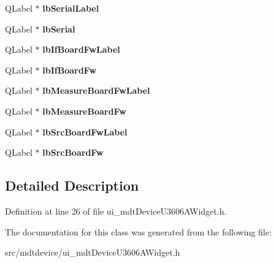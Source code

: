 \begin{DoxyCompactItemize}
\item 
\hypertarget{class_ui__mdt_device_u3606_a_widget_abdff7cf61e6f613b24d1799522c0e357}{
QLabel $\ast$ {\bfseries lbSerialLabel}}
\label{class_ui__mdt_device_u3606_a_widget_abdff7cf61e6f613b24d1799522c0e357}

\item 
\hypertarget{class_ui__mdt_device_u3606_a_widget_a268a390c071e035acaa2f1b4d211bc31}{
QLabel $\ast$ {\bfseries lbSerial}}
\label{class_ui__mdt_device_u3606_a_widget_a268a390c071e035acaa2f1b4d211bc31}

\item 
\hypertarget{class_ui__mdt_device_u3606_a_widget_ad11e8aded543cc1eeaaaf3e6753089d3}{
QLabel $\ast$ {\bfseries lbIfBoardFwLabel}}
\label{class_ui__mdt_device_u3606_a_widget_ad11e8aded543cc1eeaaaf3e6753089d3}

\item 
\hypertarget{class_ui__mdt_device_u3606_a_widget_af7898574daf7278c6eedbcfabc4dd715}{
QLabel $\ast$ {\bfseries lbIfBoardFw}}
\label{class_ui__mdt_device_u3606_a_widget_af7898574daf7278c6eedbcfabc4dd715}

\item 
\hypertarget{class_ui__mdt_device_u3606_a_widget_a495247df2ff7229a0f199926bafbc1d2}{
QLabel $\ast$ {\bfseries lbMeasureBoardFwLabel}}
\label{class_ui__mdt_device_u3606_a_widget_a495247df2ff7229a0f199926bafbc1d2}

\item 
\hypertarget{class_ui__mdt_device_u3606_a_widget_a0e3a19572ce44c827c5f2c8cdd910aac}{
QLabel $\ast$ {\bfseries lbMeasureBoardFw}}
\label{class_ui__mdt_device_u3606_a_widget_a0e3a19572ce44c827c5f2c8cdd910aac}

\item 
\hypertarget{class_ui__mdt_device_u3606_a_widget_a9e876113b12bbbd2b43a0e057ad577d0}{
QLabel $\ast$ {\bfseries lbSrcBoardFwLabel}}
\label{class_ui__mdt_device_u3606_a_widget_a9e876113b12bbbd2b43a0e057ad577d0}

\item 
\hypertarget{class_ui__mdt_device_u3606_a_widget_a7e48af183581a6be283f8fef932e8ec0}{
QLabel $\ast$ {\bfseries lbSrcBoardFw}}
\label{class_ui__mdt_device_u3606_a_widget_a7e48af183581a6be283f8fef932e8ec0}

\end{DoxyCompactItemize}


\subsection{Detailed Description}


Definition at line 26 of file ui\_\-mdtDeviceU3606AWidget.h.



The documentation for this class was generated from the following file:\begin{DoxyCompactItemize}
\item 
src/mdtdevice/ui\_\-mdtDeviceU3606AWidget.h\end{DoxyCompactItemize}
